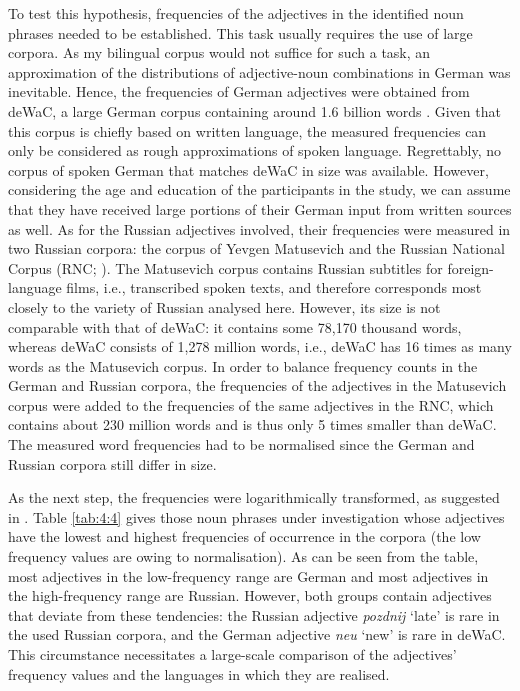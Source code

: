 To test this hypothesis, frequencies of the adjectives in the identified noun phrases needed to be established. This task usually requires the use of large corpora. As my bilingual corpus would not suffice for such a task, an approximation of the distributions of adjective-noun combinations in German was inevitable. Hence, the frequencies of German adjectives were obtained from deWaC, a large German corpus containing around 1.6 billion words \citep{baroni2006}. Given that this corpus is chiefly based on written language, the measured frequencies can only be considered as rough approximations of spoken language. Regrettably, no corpus of spoken German that matches deWaC in size was available. However, considering the age and education of the participants in the study, we can assume that they have received large portions of their German input from written sources as well. As for the Russian adjectives involved, their frequencies were measured in two Russian corpora: the corpus of Yevgen Matusevich \citep{matusevych-etal} and the Russian National Corpus (RNC; \citeyear{rnc}). The Matusevich corpus contains Russian subtitles for foreign-language films, i.e., transcribed spoken texts, and therefore  corresponds most closely to the variety of Russian analysed here. However, its size is not comparable with that of deWaC: it contains some 78,170 thousand words, whereas deWaC consists of 1,278 million words, i.e., deWaC has 16 times as many words as the Matusevich corpus. In order to balance frequency counts in the German and Russian corpora, the frequencies of the adjectives in the Matusevich corpus were added to the frequencies of the same adjectives in the RNC, which contains about 230 million words and is thus only 5 times smaller than deWaC. The measured word frequencies had to be normalised since the German and Russian corpora still differ in size. 

As the next step, the frequencies were logarithmically transformed, as suggested in \citet[][31]{baayen-analyzing}. Table \ref{tab:4:4} gives those noun phrases under investigation whose adjectives have the lowest and highest frequencies of occurrence in the corpora (the low frequency values are owing to normalisation). As can be seen from the table, most adjectives in the low-frequency range are German and most adjectives in the high-frequency range are Russian. However, both groups contain adjectives that deviate from these tendencies: the Russian adjective \textit{pozdnij} `late' is rare in the used Russian corpora, and the German adjective \textit{neu} `new' is rare in deWaC. This circumstance necessitates a large-scale comparison of the adjectives' frequency values and the languages in which they are realised.

